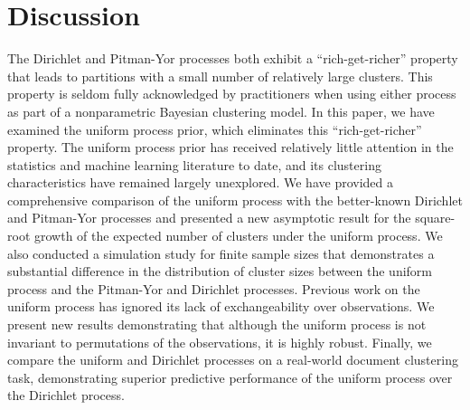 \documentclass{article}
\begin{document}

\section{Discussion}\label{discussion}

The Dirichlet and Pitman-Yor processes both exhibit a
``rich-get-richer'' property that leads to partitions with a small
number of relatively large clusters. This property is seldom fully
acknowledged by practitioners when using either process as part of a
nonparametric Bayesian clustering model. In this paper, we have
examined the uniform process prior, which eliminates this
``rich-get-richer'' property. The uniform process prior has received
relatively little attention in the statistics and machine learning
literature to date, and its clustering characteristics have remained
largely unexplored. We have provided a comprehensive comparison of the
uniform process with the better-known Dirichlet and Pitman-Yor
processes and presented a new asymptotic result for the square-root
growth of the expected number of clusters under the uniform process.
We also conducted a simulation study for finite sample sizes that
demonstrates a substantial difference in the distribution of cluster
sizes between the uniform process and the Pitman-Yor and Dirichlet
processes. Previous work on the uniform process has ignored its lack
of exchangeability over observations. We present new results
demonstrating that although the uniform process is not invariant to
permutations of the observations, it is highly robust. Finally, we
compare the uniform and Dirichlet processes on a real-world document
clustering task, demonstrating superior predictive performance of the
uniform process over the Dirichlet process.


\newpage



\end{document}
